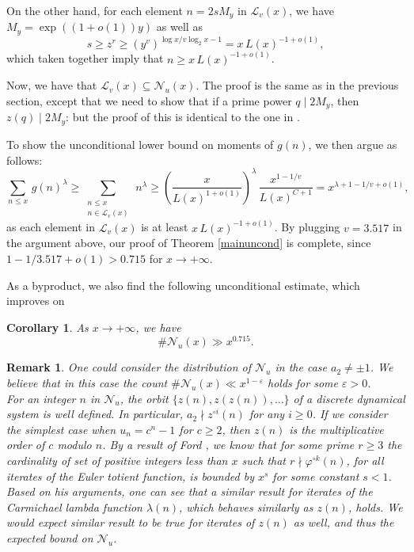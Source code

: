 \documentclass[12pt,a4paper,oneside]{amsart}
\newtheorem{remark}[theorem]{Remark}
\newtheorem{corollary}[theorem]{Corollary}
\begin{document}
On the other hand, for each element $n=2sM_y$ in $\mathcal{L}_v(x)$, we have $M_y=\exp((1+o(1))y)$ as well as \[s \ge z^r  \ge \left( {y^v} \right )^{\log x/v\log_2 x-1}= x\, L(x)^{-1+o(1)},\]
which taken together imply that $n \ge x\, L(x)^{-1+o(1)}$. 

Now, we have that $\mathcal{L}_v(x)\subseteq \mathcal{N}_{u}(x)$. The proof is the same as in the previous section, except that we need to show that if a prime power $q\mid 2M
_y$, then $z(q)\mid 2M_y$: but the proof of this is identical to the one in \cite[p. 283]{ALPS12}.

To show the unconditional lower bound on moments of $g(n)$, we then argue as follows:
\[\sum_{n\le x}\,g(n)^{\lambda} \geq \sum_{\substack{ n\le x 
\\ n\in \mathcal{L}_v(x)}}\, n^{\lambda} \ge \left( \frac{x}{L(x)^{1+o(1)}}  \right)^\lambda \, \frac{x^{1-1/v}}{L(x)^{C+1}} = x^{\lambda+1-1/v+o(1)},\] as each element in $\mathcal{L}_{v}(x)$ is at least $x\, L(x)^{-1+o(1)}$. By plugging $v=3.517$ in the argument above, our proof of Theorem \ref{mainuncond} is complete, since $1-1/3.517+o(1)>0.715$ for $x \to +\infty$.

\medskip

As a byproduct, we also find the following unconditional estimate, which improves on \cite[Th. 1.3]{ALPS12}

\begin{corollary}\label{Nu}
  As $x \to +\infty$, we have \[\#\mathcal{N}_u(x)\gg x^{0.715}.\]
\end{corollary}

\medskip


\begin{remark}\label{a2}
One could consider the distribution of $\mathcal{N}_{u}$ in the case $a_{2}\neq \pm 1$. We believe that in this case the count $\#\mathcal{N}_u(x)\ll x^{1-\varepsilon}$ holds for some $\varepsilon>0$. \\For an integer $n$ in $\mathcal{N}_u$, the orbit $\{z(n),z(z(n)), \ldots\}$ of a discrete dynamical system is well defined. In particular, $a_{2}\nmid z^{\circ i}(n)$ for any $i\ge 0$. If we consider the simplest case when $u_{n}=c^{n}-1$ for $c\geq 2$, then $z(n)$ is the multiplicative order of $c$ modulo $n$. By a result of Ford \cite[Cor. 1]{Fo14}, we know that for some prime $r\ge 3$ the cardinality of set of positive integers less than $x$ such that $r\nmid \varphi^{\circ k}(n)$, for all iterates of the Euler totient function, is bounded by $x^s$ for some constant $s<1$. Based on his arguments, one can see that a similar result for iterates of the Carmichael lambda function $\lambda(n)$, which behaves similarly as $z(n)$, holds. We would expect similar result to be true for iterates of $z(n)$ as well, and thus the expected bound on $\mathcal{N}_u$.
\end{remark}
\end{document}
